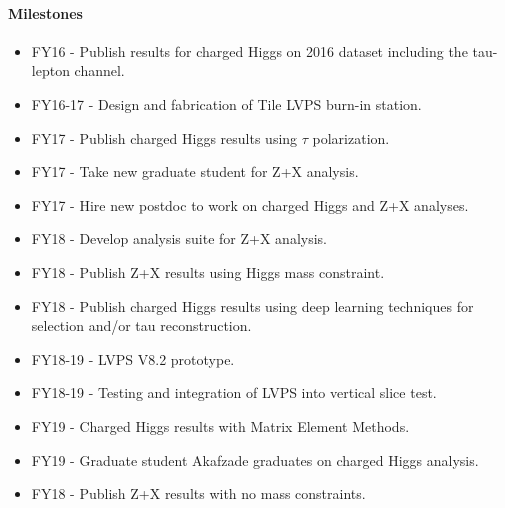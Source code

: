 \paragraph{Milestones}
\begin{itemize}[noitemsep,nolistsep]
\item{FY16 - Publish results for charged Higgs on 2016 dataset including the tau-lepton channel.}
\item{FY16-17 - Design and fabrication of Tile LVPS burn-in station.}
\item{FY17 - Publish charged Higgs results using $\tau$ polarization.}
\item{FY17 - Take new graduate student for Z+X analysis.}
\item{FY17 - Hire new postdoc to work on charged Higgs and Z+X analyses.}
\item{FY18 - Develop analysis suite for Z+X analysis.}
\item{FY18 - Publish Z+X results using Higgs mass constraint.}
\item{FY18 - Publish charged Higgs results using deep learning techniques for selection and/or tau reconstruction.}
\item{FY18-19 - LVPS V8.2 prototype.}
\item{FY18-19 - Testing and integration of LVPS into vertical slice test.}
\item{FY19 - Charged Higgs results with Matrix Element Methods.}
\item{FY19 - Graduate student Akafzade graduates on charged Higgs analysis.}
\item{FY18 - Publish Z+X results with no mass constraints.}
\end{itemize}

